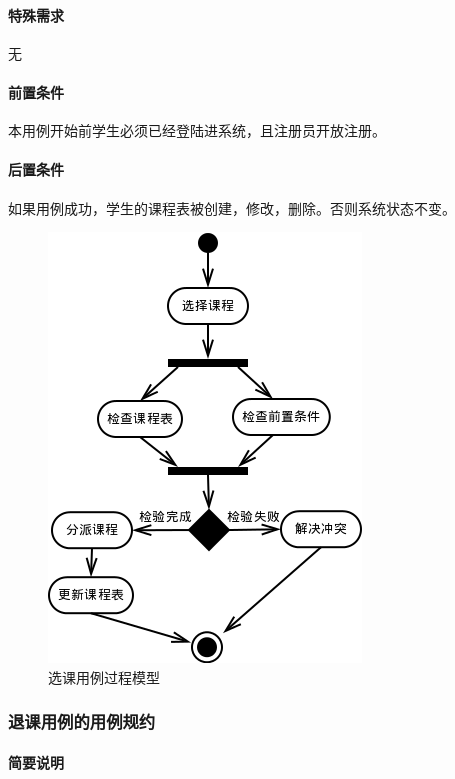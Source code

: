 \paragraph{特殊需求}
  
无
  
\paragraph{前置条件}
  
本用例开始前学生必须已经登陆进系统，且注册员开放注册。
  
\paragraph{后置条件}
  
如果用例成功，学生的课程表被创建，修改，删除。否则系统状态不变。

\begin{figure}[H]
  \centering
  \includegraphics[scale=0.7]{img/jwxt_scourse.png}
  \caption{选课用例过程模型}
\end{figure}

\subsubsection{退课用例的用例规约}
\paragraph{简要说明}
  
